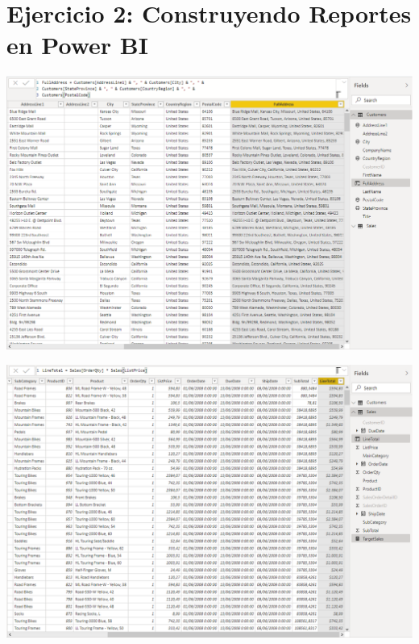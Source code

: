 \section{Ejercicio 2: Construyendo Reportes en Power BI} 

\begin{center}
\includegraphics[width=15cm]{./Imagenes/Captura3}
\end{center}	

\begin{center}
\includegraphics[width=15cm]{./Imagenes/Captura4}
\end{center}